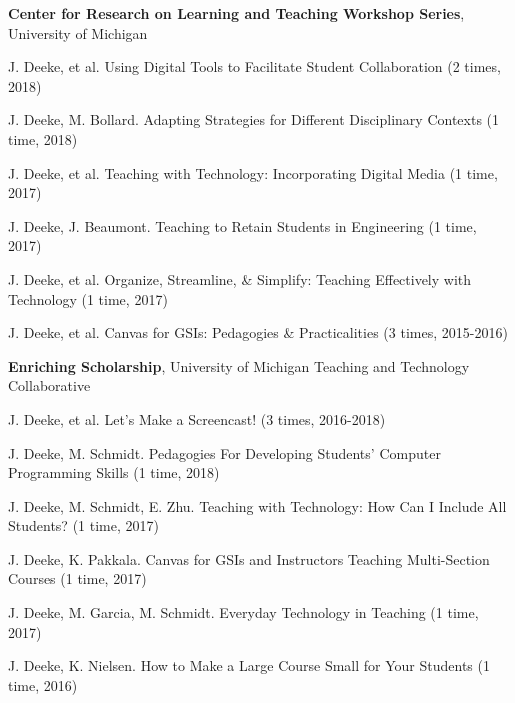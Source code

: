 \documentclass[10pt]{article}
\newenvironment{innerlist}[1][\enskip\textbullet]%
        {\begin{compactitem}[#1]}{\end{compactitem}}
\newcommand{\blankline}{\quad\pagebreak[2]}
\begin{document}
\textbf{Center for Research on Learning and Teaching Workshop Series}, University of Michigan
\begin{innerlist}
\item J. Deeke, et al. Using Digital Tools to Facilitate Student Collaboration (2 times, 2018)
\item J. Deeke, M. Bollard. Adapting Strategies for Different Disciplinary Contexts (1 time, 2018)
\item J. Deeke, et al. Teaching with Technology: Incorporating Digital Media (1 time, 2017)
\item J. Deeke, J. Beaumont. Teaching to Retain Students in Engineering (1 time, 2017)
\item J. Deeke, et al. Organize, Streamline, \& Simplify: Teaching Effectively with Technology (1 time, 2017)
\item J. Deeke, et al. Canvas for GSIs: Pedagogies \& Practicalities (3 times, 2015-2016)
\end{innerlist}
\blankline

\textbf{Enriching Scholarship}, University of Michigan Teaching and Technology Collaborative 
\begin{innerlist}
\item J. Deeke, et al. Let's Make a Screencast! (3 times, 2016-2018)
\item J. Deeke, M. Schmidt. Pedagogies For Developing Students' Computer Programming Skills (1 time, 2018)
\item J. Deeke, M. Schmidt, E. Zhu. Teaching with Technology: How Can I Include All Students? (1 time, 2017)
\item J. Deeke, K. Pakkala. Canvas for GSIs and Instructors Teaching Multi-Section Courses (1 time, 2017)
\item J. Deeke, M. Garcia, M. Schmidt. Everyday Technology in Teaching (1 time, 2017)
\item J. Deeke, K. Nielsen. How to Make a Large Course Small for Your Students (1 time, 2016)
\end{innerlist}
\blankline


\end{document}
